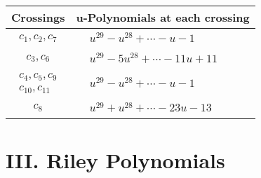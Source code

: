 \documentclass[1p]{elsarticle_modified}
\theoremstyle{definition}
\begin{document}
\begin{tabular}{m{50pt}|m{274pt}}
Crossings & \hspace{64pt}u-Polynomials at each crossing \\
\hline $$\begin{aligned}c_{1},c_{2},c_{7}\end{aligned}$$&$\begin{aligned}
&u^{29}- u^{28}+\cdots- u-1
\end{aligned}$\\
\hline $$\begin{aligned}c_{3},c_{6}\end{aligned}$$&$\begin{aligned}
&u^{29}-5 u^{28}+\cdots-11 u+11
\end{aligned}$\\
\hline $$\begin{aligned}c_{4},c_{5},c_{9}\\c_{10},c_{11}\end{aligned}$$&$\begin{aligned}
&u^{29}- u^{28}+\cdots- u-1
\end{aligned}$\\
\hline $$\begin{aligned}c_{8}\end{aligned}$$&$\begin{aligned}
&u^{29}+u^{28}+\cdots-23 u-13
\end{aligned}$\\
\hline
\end{tabular}\newpage\renewcommand{\arraystretch}{1}
\centering \section*{ III. Riley Polynomials}
\end{document}
